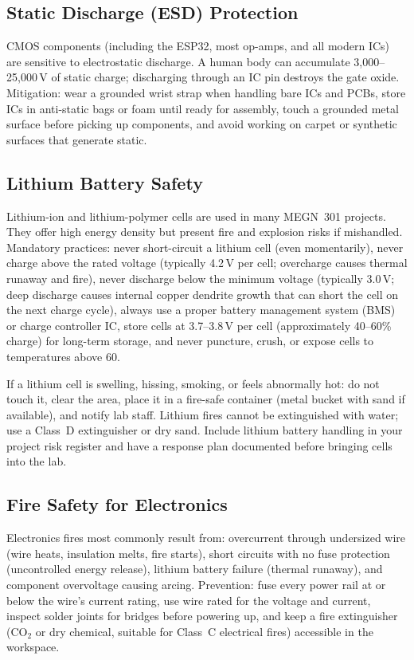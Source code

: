 \subsection{Static Discharge (ESD) Protection}
CMOS components (including the ESP32, most op-amps, and all modern ICs) are sensitive to electrostatic discharge. A human body can accumulate 3,000--25,000\,V of static charge; discharging through an IC pin destroys the gate oxide. Mitigation: wear a grounded wrist strap when handling bare ICs and PCBs, store ICs in anti-static bags or foam until ready for assembly, touch a grounded metal surface before picking up components, and avoid working on carpet or synthetic surfaces that generate static.

\subsection{Lithium Battery Safety}
Lithium-ion and lithium-polymer cells are used in many MEGN~301 projects. They offer high energy density but present fire and explosion risks if mishandled. Mandatory practices: never short-circuit a lithium cell (even momentarily), never charge above the rated voltage (typically 4.2\,V per cell; overcharge causes thermal runaway and fire), never discharge below the minimum voltage (typically 3.0\,V; deep discharge causes internal copper dendrite growth that can short the cell on the next charge cycle), always use a proper battery management system (BMS) or charge controller IC, store cells at 3.7--3.8\,V per cell (approximately 40--60\% charge) for long-term storage, and never puncture, crush, or expose cells to temperatures above 60\degC{}.

\begin{warningbox}
If a lithium cell is swelling, hissing, smoking, or feels abnormally hot: do not touch it, clear the area, place it in a fire-safe container (metal bucket with sand if available), and notify lab staff. Lithium fires cannot be extinguished with water; use a Class~D extinguisher or dry sand. Include lithium battery handling in your project risk register and have a response plan documented before bringing cells into the lab.
\end{warningbox}

\subsection{Fire Safety for Electronics}
Electronics fires most commonly result from: overcurrent through undersized wire (wire heats, insulation melts, fire starts), short circuits with no fuse protection (uncontrolled energy release), lithium battery failure (thermal runaway), and component overvoltage causing arcing. Prevention: fuse every power rail at or below the wire's current rating, use wire rated for the voltage and current, inspect solder joints for bridges before powering up, and keep a fire extinguisher (CO$_2$ or dry chemical, suitable for Class~C electrical fires) accessible in the workspace.



